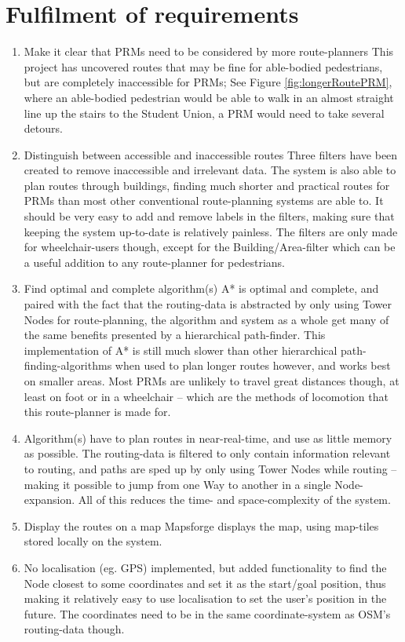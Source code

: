 \section{Fulfilment of requirements}
\begin{enumerate}
	\item Make it clear that PRMs need to be considered by more route-planners
	\subitem This project has uncovered routes that may be fine for able-bodied pedestrians, but are completely inaccessible for PRMs; See Figure \ref{fig:longerRoutePRM}, where an able-bodied pedestrian would be able to walk in an almost straight line up the stairs to the Student Union, a PRM would need to take several detours.
	\item Distinguish between accessible and inaccessible routes
	\subitem Three filters have been created to remove inaccessible and irrelevant data. The system is also able to plan routes through buildings, finding much shorter and practical routes for PRMs than most other conventional route-planning systems are able to.
	\subitem It should be very easy to add and remove labels in the filters, making sure that keeping the system up-to-date is relatively painless. The filters are only made for wheelchair-users though, except for the Building/Area-filter which can be a useful addition to any route-planner for pedestrians.
	\item Find optimal and complete algorithm(s)
	\subitem A* is optimal and complete, and paired with the fact that the routing-data is abstracted by only using Tower Nodes for route-planning, the algorithm and system as a whole get many of the same benefits presented by a hierarchical path-finder.
	\subsubitem This implementation of A* is still much slower than other hierarchical path-finding-algorithms when used to plan longer routes however, and works best on smaller areas. Most PRMs are unlikely to travel great distances though, at least on foot or in a wheelchair -- which are the methods of locomotion that this route-planner is made for.
	\item Algorithm(s) have to plan routes in near-real-time, and use as little memory as possible.
	\subitem The routing-data is filtered to only contain information relevant to routing, and paths are sped up by only using Tower Nodes while routing -- making it possible to jump from one Way to another in a single Node-expansion. All of this reduces the time- and space-complexity of the system.
	\item Display the routes on a map
	\subitem Mapsforge\cite{Mapsforge,Mapsforge_map-tiles} displays the map, using map-tiles stored locally on the system.
	\item No localisation (eg. GPS) implemented, but added functionality to find the Node closest to some coordinates and set it as the start/goal position, thus making it relatively easy to use localisation to set the user's position in the future. The coordinates need to be in the same coordinate-system as OSM's routing-data though\cite{OSM_Convert-WGS84}.
\end{enumerate}